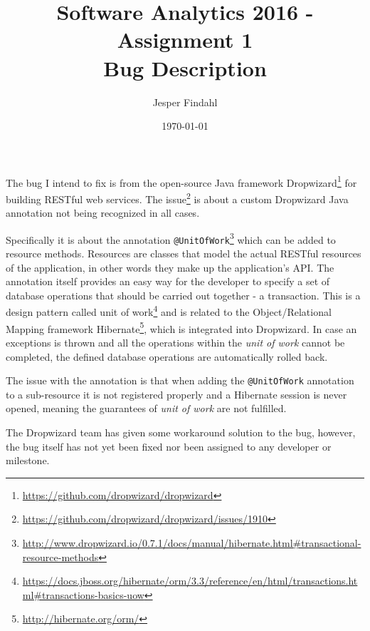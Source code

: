 \documentclass[11pt]{article}
\begin{document}

\title{\Large Software Analytics 2016 - Assignment 1 \\\vspace{0.7cm} \huge Bug Description}
\date{\today}
\author{Jesper Findahl}
\maketitle
\thispagestyle{empty}



The bug I intend to fix is from the open-source Java framework Dropwizard\footnote{\url{https://github.com/dropwizard/dropwizard}} for building RESTful web services. The issue\footnote{\url{https://github.com/dropwizard/dropwizard/issues/1910}} is about a custom Dropwizard Java annotation not being recognized in all cases.

Specifically it is about the annotation \texttt{@UnitOfWork}\footnote{\url{http://www.dropwizard.io/0.7.1/docs/manual/hibernate.html#transactional-resource-methods}} which can be added to resource methods. Resources are classes that model the actual RESTful resources of the application, in other words they make up the application's API. The annotation itself provides an easy way for the developer to specify a set of database operations that should be carried out together - a transaction. This is a design pattern called unit of work\footnote{\url{https://docs.jboss.org/hibernate/orm/3.3/reference/en/html/transactions.html#transactions-basics-uow}} and is related to the Object/Relational Mapping framework Hibernate\footnote{\url{http://hibernate.org/orm/}}, which is integrated into Dropwizard. In case an exceptions is thrown and all the operations within the \emph{unit of work} cannot be completed, the defined database operations are automatically rolled back.

The issue with the annotation is that when adding the \texttt{@UnitOfWork} annotation to a sub-resource it is not registered properly and a Hibernate session is never opened, meaning the guarantees of \emph{unit of work} are not fulfilled.

The Dropwizard team has given some workaround solution to the bug, however, the bug itself has not yet been fixed nor been assigned to any developer or milestone.
\end{document}
